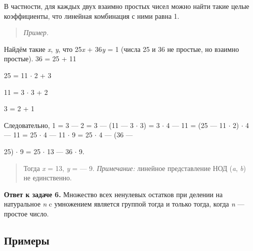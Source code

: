\documentclass[12pt]{article}
\begin{document}
В частности, для каждых двух взаимно простых чисел можно найти такие
целые коэффициенты, что линейная комбинация с ними равна 1.

\begin{quote}
    \emph{Пример.}
\end{quote}

Найдём такие \emph{x}, \emph{y}, что 25\emph{x} + 36\emph{y} = 1 (числа
25 и 36 не простые, но взаимно простые). 36 = 25 + 11

25 = 11 $\cdot$ 2 + 3

11 = 3 $\cdot$ 3 + 2

3 = 2 + 1

Следовательно, 1 = 3 --- 2 = 3 --- (11 --- 3 $\cdot$ 3) = 3 $\cdot$ 4 --- 11 = (25 --- 11
$\cdot$ 2) $\cdot$ 4 --- 11 = 25 $\cdot$ 4 --- 11 $\cdot$ 9 = 25 $\cdot$ 4 --- (36 ---

25) $\cdot$ 9 = 25 $\cdot$ 13 --- 36 $\cdot$ 9.

\begin{quote}
    Тогда \emph{x} = 13, \emph{y} = --- 9. \emph{Примечание:} линейное
    представление НОД (\emph{a}, \emph{b}) не единственно.
\end{quote}

\textbf{Ответ к задаче 6.} Множество всех ненулевых остатков при делении
на натуральное \emph{n} c умножением является группой тогда и только
тогда, когда \emph{n} --- простое число.

\subsection{Примеры}
\end{document}

